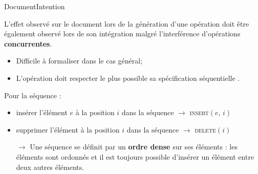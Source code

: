 \begin{frame}{Document}{Intention}
  
  L'effet observé sur le document lors de la génération d'une opération doit
  être également observé lors de son intégration malgré l'interférence
  d'opérations \textbf{concurrentes}.

  \vspace{0.5cm}

  \begin{itemize}
  \item Difficile à formaliser dans le cas général;
  \item L'opération doit respecter le plus possible sa spécification
    séquentielle .
  \end{itemize}

  \vspace{0.5cm}
  
  Pour la séquence :
  \begin{itemize}
  \item \og insérer l'élément $e$ à la position $i$ dans la séquence \fg
    $\rightarrow$ \textsc{insert}$(e,\,i)$
  \item \small \og supprimer l'élément à la position $i$ dans la séquence \fg
    $\rightarrow$ \textsc{delete}$(i)$
  \end{itemize}


  \vspace{0.5cm}

  \begin{itemize}
  \item [$\rightarrow$] Une séquence se définit par un \textbf{ordre dense} sur
    ses éléments : les éléments sont ordonnés et il est toujours possible
    d'insérer un élément entre deux autres éléments.
  \end{itemize}

  \vspace{0.2cm}
  
\end{frame}



